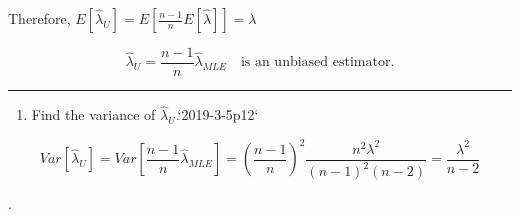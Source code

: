 \documentclass[12pt,]{article}
\newenvironment{Shaded}{\begin{snugshade}}{\end{snugshade}}
\newcommand{\NormalTok}[1]{#1}
\providecommand{\tightlist}{%
  \setlength{\itemsep}{0pt}\setlength{\parskip}{0pt}}
\begin{document}
Therefore, \(E[\hat\lambda_{U}]=E[\frac{n-1}{n}E[\hat\lambda]]=\lambda\)

\[\hat\lambda_{U}=\frac{n-1}{n}\hat\lambda_{MLE}\quad \text{is an unbiased estimator.}\]

\begin{center}\rule{0.5\linewidth}{\linethickness}\end{center}

\begin{enumerate}
\def\labelenumi{\alph{enumi}.}
\setcounter{enumi}{4}
\tightlist
\item
  \textcolor[rgb]{0.7,0.7,0.7}{Find the variance of $\hat\lambda_{U}$.`2019-3-5p12`}
\end{enumerate}

\[Var[\hat\lambda_{U}]=Var[\frac{n-1}{n}\hat\lambda_{MLE}]=(\frac{n-1}{n})^2\frac{n^2\lambda^2}{(n-1)^2(n-2)}=\frac{\lambda^2}{n-2}\]

\begin{Shaded}
\begin{Highlighting}[]
\NormalTok{.}
\end{Highlighting}
\end{Shaded}
\end{document}
